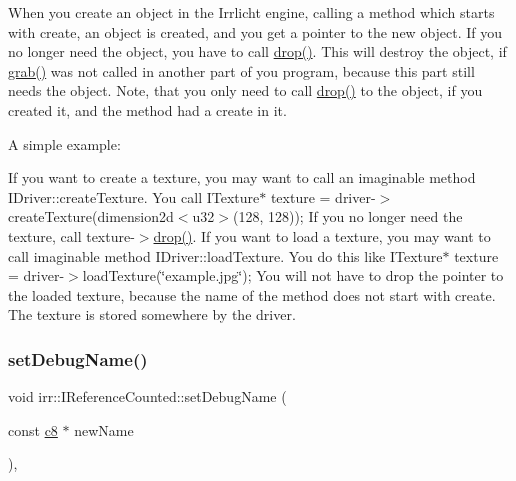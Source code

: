 When you create an object in the Irrlicht engine, calling a method which starts with \textquotesingle{}create\textquotesingle{}, an object is created, and you get a pointer to the new object. If you no longer need the object, you have to call \hyperlink{classirr_1_1IReferenceCounted_a03856a09355b89d178090c4a5f738543}{drop()}. This will destroy the object, if \hyperlink{classirr_1_1IReferenceCounted_a396f9cdbe311ada278626477b3c6f0f5}{grab()} was not called in another part of you program, because this part still needs the object. Note, that you only need to call \hyperlink{classirr_1_1IReferenceCounted_a03856a09355b89d178090c4a5f738543}{drop()} to the object, if you created it, and the method had a \textquotesingle{}create\textquotesingle{} in it.

A simple example\+:

If you want to create a texture, you may want to call an imaginable method I\+Driver\+::create\+Texture. You call I\+Texture$\ast$ texture = driver-\/$>$create\+Texture(dimension2d$<$u32$>$(128, 128)); If you no longer need the texture, call texture-\/$>$\hyperlink{classirr_1_1IReferenceCounted_a03856a09355b89d178090c4a5f738543}{drop()}. If you want to load a texture, you may want to call imaginable method I\+Driver\+::load\+Texture. You do this like I\+Texture$\ast$ texture = driver-\/$>$load\+Texture(\char`\"{}example.\+jpg\char`\"{}); You will not have to drop the pointer to the loaded texture, because the name of the method does not start with \textquotesingle{}create\textquotesingle{}. The texture is stored somewhere by the driver. \mbox{\label{classirr_1_1IReferenceCounted_a704c5042d399fe8cd3bdd65a0559002a}} 
\subsubsection{\texorpdfstring{set\+Debug\+Name()}{setDebugName()}\hspace{0.1cm}{\footnotesize\ttfamily [1/2]}}
{\footnotesize\ttfamily void irr\+::\+I\+Reference\+Counted\+::set\+Debug\+Name (\begin{DoxyParamCaption}\item[{const \hyperlink{namespaceirr_a9395eaea339bcb546b319e9c96bf7410}{c8} $\ast$}]{new\+Name }\end{DoxyParamCaption})\hspace{0.3cm}{\ttfamily [inline]}, {\ttfamily [protected]}}



